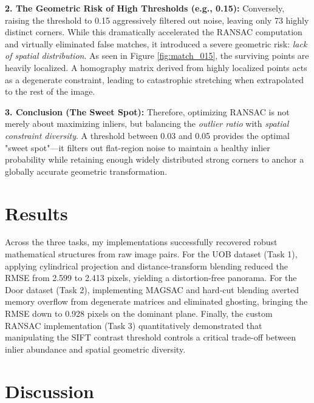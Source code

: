 \documentclass{Resources/UoBLab1}
\begin{document}
    \textbf{2. The Geometric Risk of High Thresholds (e.g., 0.15):} Conversely, raising
    the threshold to 0.15 aggressively filtered out noise, leaving only 73
    highly distinct corners. While this dramatically accelerated the RANSAC computation
    and virtually eliminated false matches, it introduced a severe geometric
    risk: \textit{lack of spatial distribution}. As seen in Figure \ref{fig:match_015},
    the surviving points are heavily localized. A homography matrix derived from
    highly localized points acts as a degenerate constraint, leading to
    catastrophic stretching when extrapolated to the rest of the image.

    \textbf{3. Conclusion (The Sweet Spot):} Therefore, optimizing RANSAC is not
    merely about maximizing inliers, but balancing the \textit{outlier ratio}
    with \textit{spatial constraint diversity}. A threshold between 0.03 and
    0.05 provides the optimal "sweet spot"—it filters out flat-region noise to maintain
    a healthy inlier probability while retaining enough widely distributed strong
    corners to anchor a globally accurate geometric transformation.

    \section{Results}
    Across the three tasks, my implementations successfully recovered robust
    mathematical structures from raw image pairs. For the UOB dataset (Task 1),
    applying cylindrical projection and distance-transform blending reduced the
    RMSE from 2.599 to 2.413 pixels, yielding a distortion-free panorama. For
    the Door dataset (Task 2), implementing MAGSAC and hard-cut blending averted
    memory overflow from degenerate matrices and eliminated ghosting, bringing
    the RMSE down to 0.928 pixels on the dominant plane. Finally, the custom
    RANSAC implementation (Task 3) quantitatively demonstrated that manipulating
    the SIFT contrast threshold controls a critical trade-off between inlier
    abundance and spatial geometric diversity.
    \section{Discussion}
\end{document}
